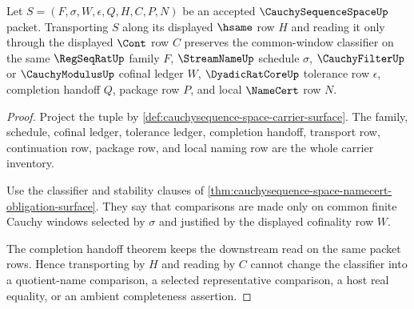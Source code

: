 \begin{theorem}
\label{thm:cauchysequence-space-common-window-classifier-transport}
Let $S=(F,\sigma,W,\epsilon,Q,H,C,P,N)$ be an accepted $\CauchySequenceSpaceUp$ packet. Transporting $S$ along its displayed $\hsame$ row $H$ and reading it only through the displayed $\Cont$ row $C$ preserves the common-window classifier on the same $\RegSeqRatUp$ family $F$, $\StreamNameUp$ schedule $\sigma$, $\CauchyFilterUp$ or $\CauchyModulusUp$ cofinal ledger $W$, $\DyadicRatCoreUp$ tolerance row $\epsilon$, completion handoff $Q$, package row $P$, and local $\NameCert$ row $N$.
\end{theorem}
\begin{proof}
Project the tuple by \autoref{def:cauchysequence-space-carrier-surface}. The family, schedule, cofinal ledger, tolerance ledger, completion handoff, transport row, continuation row, package row, and local naming row are the whole carrier inventory.

Use the classifier and stability clauses of \autoref{thm:cauchysequence-space-namecert-obligation-surface}. They say that comparisons are made only on common finite Cauchy windows selected by $\sigma$ and justified by the displayed cofinality row $W$.

The completion handoff theorem keeps the downstream read on the same packet rows. Hence transporting by $H$ and reading by $C$ cannot change the classifier into a quotient-name comparison, a selected representative comparison, a host real equality, or an ambient completeness assertion.
\end{proof}


